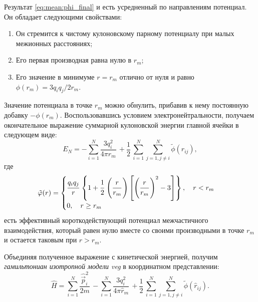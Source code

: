 Результат \eqref{eq:mean:phi_final} и есть усредненный по направлениям потенциал.
Он обладает следующими свойствами:
\begin{enumerate}
    \item Он стремится к чистому кулоновскому парному потенциалу при малых межионных расстояниях;
    \item Его первая производная равна нулю в $r_{m}$;
    \item Его значение в минимуме $r = r_m$ отлично от нуля и равно $\phi (r_m ) = 3 q_i q_j / 2 r_m$.
\end{enumerate}

Значение потенциала в точке $r_m$ можно обнулить, прибавив к нему постоянную добавку $-\phi (r_m)$.
Воспользовавшись условием электронейтральности, получаем окончательное выражение суммарной кулоновской энергии главной ячейки в следующем виде:
\begin{equation}
    \label{eq:mean:E_coloumb_main-cell_final}
    E_N = - \sum\limits_{i=1}^{N} \frac{3q_{i}^2}{4\pi r_m}\, + \frac{1}{2}\, \sum\limits_{i=1}^{N} \sum\limits_{j=1, j \neq i}^{N} \tilde{\phi} (r_{ij}),
\end{equation}
где
\begin{equation}
    \label{eq:mean:phi_tilde}
    \tilde{\phi} (r) =
    \begin{cases}
        \cfrac{q_i q_j}{r}\, \left\{ 1 + \cfrac{1}{2}\, \left( \cfrac{r}{r_m}\,  \right) \left[ \left(\cfrac{r}{r_m}\,   \right)^2 - 3 \right] \right\}, \quad r < r_m \\
        0, \quad r \geq r_m
    \end{cases}
\end{equation}
есть эффективный короткодействующий потенциал межчастичного взаимодействия, который равен нулю вместе со своими производными в точке $r_m$ и остается таковым при $r > r_m$.

Объединяя полученное выражение с кинетической энергией, получим \textit{гамильтониан изотропной модели \acrshort{veg}} в координатном представлении:
\begin{equation}
    \label{eq:mean:ham_final}
    \hat{H} = \sum\limits_{i=1}^{N} \frac{\hat{\vec{p}}_{i}^2}{2m}\, - \sum\limits_{i=1}^{N} \frac{3q_{i}^2}{4\pi \hat{r}_m}\, + \frac{1}{2}\, \sum\limits_{i=1}^{N} \sum\limits_{j=1, j \neq i}^{N} \tilde{\phi} (\hat{r}_{ij}).
\end{equation}
